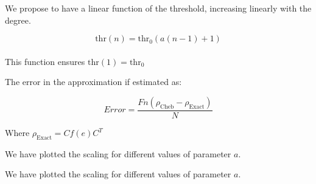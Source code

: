 We propose to have a linear function of the threshold, increasing linearly with the degree. 

\begin{equation}
   \mathrm{thr}(n) = \mathrm{thr_0}(a(n-1)+1)
\end{equation}
\\
\vspace{0.5cm}
This function ensures $\mathrm{thr}(1) = \mathrm{thr_0}$

\vspace{0.5cm}

The error in the approximation if estimated as: 

\begin{equation}
   Error = \frac{Fn(\rho_{\mathrm{Cheb}} - \rho_{\mathrm{Exact}})}{N}
\end{equation}

\vspace{0.5cm}

Where $\rho_{\mathrm{Exact}} = C f(e) C^T$

We have plotted the scaling for different values of parameter $a$.

   \begin{center}
   \end{center}  



We have plotted the scaling for different values of parameter $a$.

   \begin{center}
   \end{center}  



